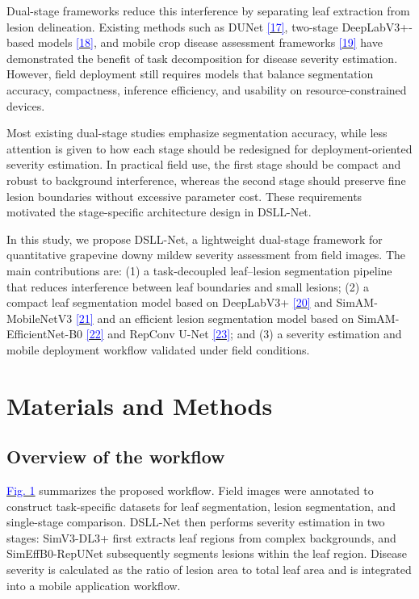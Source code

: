 \documentclass[
]{article}
\begin{document}
Dual-stage frameworks reduce this interference by separating leaf
extraction from lesion delineation. Existing methods such as DUNet
\hyperlink{ref:17}{\textcolor{blue}{[17]}}, two-stage DeepLabV3+-based
models \hyperlink{ref:18}{\textcolor{blue}{[18]}}, and mobile crop disease
assessment frameworks \hyperlink{ref:19}{\textcolor{blue}{[19]}} have
demonstrated the benefit of task decomposition for disease severity
estimation.
However, field deployment still requires models that balance
segmentation accuracy, compactness, inference efficiency, and usability
on resource-constrained devices.

Most existing dual-stage studies emphasize segmentation accuracy, while
less attention is given to how each stage should be redesigned for
deployment-oriented severity estimation. In practical field use, the
first stage should be compact and robust to background interference,
whereas the second stage should preserve fine lesion boundaries without
excessive parameter cost. These requirements motivated the stage-specific
architecture design in DSLL-Net.

In this study, we propose DSLL-Net, a lightweight dual-stage framework
for quantitative grapevine downy mildew severity assessment from field
images. The main contributions are: (1) a task-decoupled leaf--lesion
segmentation pipeline that reduces interference between leaf boundaries
and small lesions; (2) a compact leaf segmentation model based on
DeepLabV3+ \hyperlink{ref:20}{\textcolor{blue}{[20]}} and
SimAM-MobileNetV3 \hyperlink{ref:21}{\textcolor{blue}{[21]}} and an efficient lesion segmentation
model based on SimAM-EfficientNet-B0 \hyperlink{ref:22}{\textcolor{blue}{[22]}}
and RepConv U-Net \hyperlink{ref:23}{\textcolor{blue}{[23]}}; and (3) a
severity estimation and mobile deployment workflow validated under field
conditions.

\hypertarget{materials-and-methods}{%
\section{Materials and Methods}\label{materials-and-methods}}

\hypertarget{overview-of-the-workflow}{%
\subsection{Overview of the workflow}\label{overview-of-the-workflow}}

\hyperlink{fig:1}{\textcolor{blue}{Fig. 1}} summarizes the proposed workflow. Field images were annotated to
construct task-specific datasets for leaf segmentation, lesion
segmentation, and single-stage comparison. DSLL-Net then performs
severity estimation in two stages: SimV3-DL3+ first extracts leaf regions
from complex backgrounds, and SimEffB0-RepUNet subsequently segments
lesions within the leaf region. Disease severity is calculated as the
ratio of lesion area to total leaf area and is integrated into a mobile
application workflow.
\end{document}
